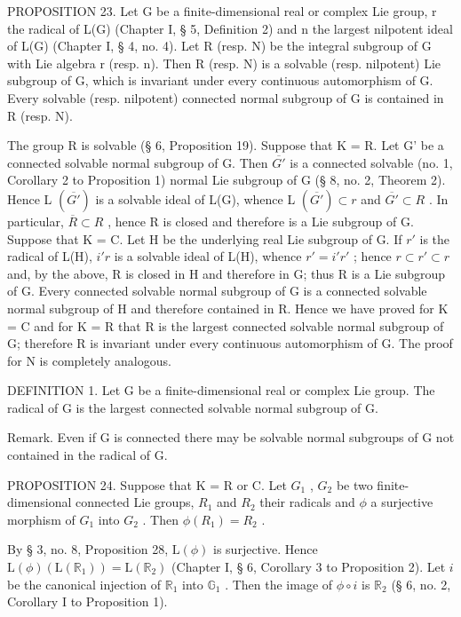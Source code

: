 PROPOSITION 23. Let G be a finite-dimensional real or complex Lie group, r the radical of L(G) (Chapter I, § 5, Definition 2) and n the largest nilpotent ideal of L(G) (Chapter I, § 4, no. 4). Let R (resp. N) be the integral subgroup of G with Lie algebra r (resp. n). Then R (resp. N) is a solvable (resp. nilpotent) Lie subgroup of G, which is invariant under every continuous automorphism of G. Every solvable (resp. nilpotent) connected normal subgroup of G is contained in R (resp. N).

The group R is solvable (§ 6, Proposition 19). Suppose that K = R. Let G' be a connected solvable normal subgroup of G. Then \(\overline{G'}\) is a connected solvable (no. 1, Corollary 2 to Proposition 1) normal Lie subgroup of G (§ 8, no. 2, Theorem 2). Hence L \((\overline{G'})\) is a solvable ideal of L(G), whence L \((\overline{G'}) \subset r\) and \(\overline{G'} \subset R\) . In particular, \(\overline{R} \subset R\) , hence R is closed and therefore is a Lie subgroup of G. Suppose that K = C. Let H be the underlying real Lie subgroup of G. If \(r'\) is the radical of L(H), \(i'r\) is a solvable ideal of L(H), whence \(r' = i'r'\) ; hence \(r \subset r' \subset r\) and, by the above, R is closed in H and therefore in G; thus R is a Lie subgroup of G. Every connected solvable normal subgroup of G is a connected solvable normal subgroup of H and therefore contained in R. Hence we have proved for K = C and for K = R that R is the largest connected solvable normal subgroup of G; therefore R is invariant under every continuous automorphism of G. The proof for N is completely analogous.

DEFINITION 1. Let G be a finite-dimensional real or complex Lie group. The radical of G is the largest connected solvable normal subgroup of G.

Remark. Even if G is connected there may be solvable normal subgroups of G not contained in the radical of G.

PROPOSITION 24. Suppose that K = R or C. Let \(G_{1}\) , \(G_{2}\) be two finite-dimensional connected Lie groups, \(R_{1}\) and \(R_{2}\) their radicals and \(\phi\) a surjective morphism of \(G_{1}\) into \(G_{2}\) . Then \(\phi(R_{1}) = R_{2}\) .

By § 3, no. 8, Proposition 28, \(\mathrm{L}(\phi)\) is surjective. Hence \(\mathrm{L}(\phi)(\mathrm{L}(\mathbb{R}_1)) = \mathrm{L}(\mathbb{R}_2)\) (Chapter I, § 6, Corollary 3 to Proposition 2). Let \(i\) be the canonical injection of \(\mathbb{R}_1\) into \(\mathbb{G}_1\) . Then the image of \(\phi \circ i\) is \(\mathbb{R}_2\) (§ 6, no. 2, Corollary I to Proposition 1).


